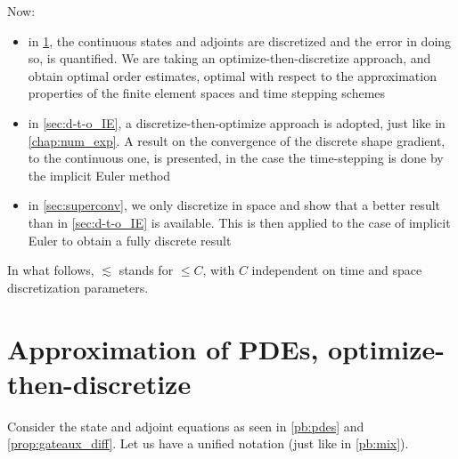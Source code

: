 \documentclass[english,a4paper,9pt,oneside]{scrbook}	%
\theoremstyle{break}
\theoremstyle{remark}
\begin{document}
Now:

\begin{itemize}
	\item in \cref{sec:o-t-d}, the continuous states and adjoints are discretized and the error in doing so, is quantified. We are taking an optimize-then-discretize approach, and obtain optimal order estimates, optimal with respect to the approximation properties of the finite element spaces and time stepping schemes
	\item in \cref{sec:d-t-o_IE}, a discretize-then-optimize approach is adopted, just like in \cref{chap:num_exp}. A result on the convergence of the discrete shape gradient, to the continuous one, is presented, in the case the time-stepping is done by the implicit Euler method
	\item in \cref{sec:superconv}, we only discretize in space and show that a better result than in \cref{sec:d-t-o_IE} is available. This is then applied to the case of implicit Euler to obtain a fully discrete result
	

\end{itemize}

In what follows, $\lesssim$ stands for $\leq C$, with $C$ independent on time and space discretization parameters.

\section{Approximation of PDEs, optimize-then-discretize}
\label{sec:o-t-d}

Consider the state and adjoint equations as seen in \cref{pb:pdes} and \cref{prop:gateaux_diff}. Let us have a unified notation (just like in \cref{pb:mix}).
\end{document}
